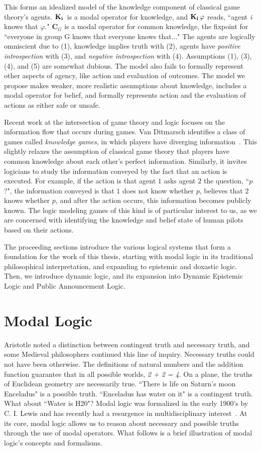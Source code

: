 This forms an idealized model of the knowledge component of classical game theory's agents. $\mathbf{K}_{\mathbf{i}}\,$ is a modal operator for knowledge, and $\mathbf{K}_{\mathbf{i}}\,\varphi$ reads, ``agent \emph{i} knows that $\varphi$." $\mathbf{C}_G$ is a modal operator for common knowledge, the fixpoint for ``everyone in group G knows that everyone knows that..." The agents are logically omniscient due to (1), knowledge implies truth with (2), agents have \emph{positive introspection} with (3), and \emph{negative introspection} with (4). Assumptions (1), (3), (4), and (5) are somewhat dubious. The model also fails to formally represent other aspects of agency, like action and evaluation of outcomes. The model we propose makes weaker, more realistic assumptions about knowledge, includes a modal operator for belief, and formally represents action and the evaluation of actions as either safe or unsafe.

Recent work at the intersection of game theory and logic focuses on the information flow that occurs during games. Van Ditmarsch identifies a class of games called \emph{knowledge games}, in which players have diverging information~\cite{ditmarsch}. This slightly relaxes the assumption of classical game theory that players have common knowledge about each other's perfect information. Similarly, it invites logicians to study the information conveyed by the fact that an action is executed. For example, if the action is that agent $1$ asks agent $2$ the question, ``$p$?", the information conveyed is that $1$ does not know whether $p$, believes that $2$ knows whether $p$, and after the action occurs, this information becomes publicly known. The logic modeling games of this kind is of particular interest to us, as we are concerned with identifying the knowledge and belief state of human pilots based on their actions. 

The proceeding sections introduce the various logical systems that form a foundation for the work of this thesis, starting with modal logic in its traditional philosophical interpretation, and expanding to epistemic and doxastic logic. Then, we introduce dynamic logic, and its expansion into Dynamic Epistemic Logic and Public Announcement Logic.

\section{Modal Logic}\label{sec:logic_foundation}
Aristotle noted a distinction between contingent truth and necessary truth, and some Medieval philosophers continued this line of inquiry. Necessary truths could not have been otherwise. The definitions of natural numbers and the addition function guarantee that in all possible worlds, \emph{2 + 2 = 4}. On a plane, the truths of Euclidean geometry are necessarily true. ``There is life on Saturn's moon Enceladus" is a possible truth. ``Enceladus has water on it" is a contingent truth. What about ``Water is H20"? Modal logic was formalized in the early 1900's by C. I. Lewis and has recently had a resurgence in multidisciplinary interest~\cite{VB_MLOM}. At its core, modal logic allows us to reason about necessary and possible truths through the use of modal operators. What follows is a brief illustration of modal logic's concepts and formalisms.


